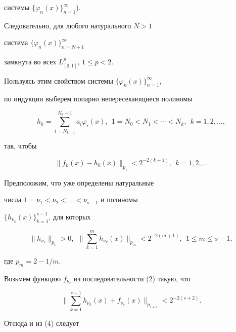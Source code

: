 \begin{pf}
системы $\{\varphi_n(x)\}_{n=1}^\infty$).


Следовательно, для любого натурального $N>1$ 


система $\{\varphi_n(x)\}_{n=N+1}^\infty$


замкнута во всех $L^p_{[0,1]}$, $ 1\leq p <2$.





Пользуясь этим свойством системы $\{\varphi_n(x)\}_{n=1}^\infty$,


по индукции выберем попарно непересекающиеся полиномы 


\begin{equation}


h_k=\sum_{i=N_{k-1}}^{N_k-1} a_i \varphi_i(x),


\ \ 1=N_0<N_1<\dotsb<N_k,\ \ k=1,2,\dotsc,


\end{equation}


так, чтобы 


\begin{equation}


\|f_k(x)-h_k(x)\|_{p_1}<2^{-2(k+1)} ,\ \ k=1,2,\dotsc


\end{equation}





Предположим, что уже определены натуральные 


числа $1=\nu_1<\nu_2<\dotsc<\nu_{s-1}$ и полиномы


$\{ h_{\nu_k}(x)\}_{k=1}^{s-1}$, для которых


\begin{equation}


\|h_{\nu_1}\|_{p_1}>0,\ \


\bigg\|\sum_{k=1}^m h_{\nu_k}(x)\bigg\|_{p_m}<2^{-2(m+1)},


\ \ 1\leq m \leq s-1,


\end{equation}


где $p_m=2-1/m$.


Возьмем функцию $f_{\nu_s}$ из последовательности (2) такую, что


$$


\bigg\|\sum_{k=1}^{s-1}h_{\nu_k}(x)+f_{\nu_s}(x)\bigg\|_{p_{s+1}}<2^{-2(s+2)}.


$$


Отсюда и из (4) следует


\begin{equation}



\end{equation}
\end{pf}
